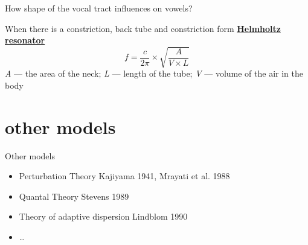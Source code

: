 \begin{frame}{How shape of the vocal tract influences on vowels?}
\Large
\vfill
\begin{center}
\begin{vowel}
\end{vowel}
\end{center}
\vfill
\normalsize
When there is a constriction, back tube and constriction form \href{https://github.com/agricolamz/2018_m_Instrumental_Phonetics/raw/master/docs/materials/Helmholtz-resonance.mp4}{\textbf{Helmholtz resonator}}
$$f = \frac{c}{2\pi} \times \sqrt{\frac{A}{V\times L}}$$
\textit{A} --- the area of the neck; \textit{L} --- length of the tube; \textit{V} --- volume of the air in the body
\end{frame}

\section{other models}
\begin{frame}{Other models}
\begin{itemize}
\item Perturbation Theory Kajiyama 1941, Mrayati et al. 1988
\item Quantal Theory Stevens 1989
\item Theory of adaptive dispersion Lindblom 1990
\item \dots
\end{itemize}
\end{frame}

